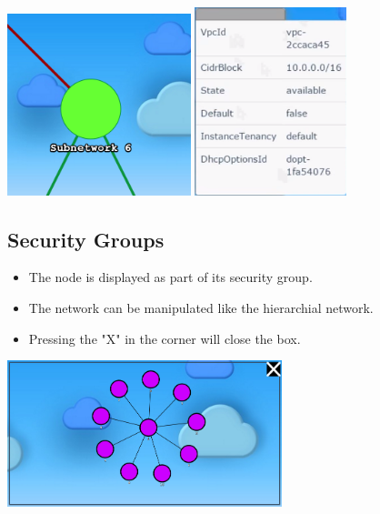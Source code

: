 \documentclass[hidelinks,a4paper,12pt]{article}
\begin{document}
				\begin{center}
					\includegraphics[width=0.40\textwidth]{./images/SelectNode.png}
					\includegraphics[width=0.33\textwidth]{./images/Info.png}
				\end{center}
			
		\subsection{Security Groups}
			\begin {itemize}
				\item The node is displayed as part of its security group.
				\item The network can be manipulated like the hierarchial network.
				\item Pressing the "X" in the corner will close the box.
			\end{itemize}
		
		\begin{center}
			\includegraphics[width=0.60\textwidth]{./images/SecurityGroup.png}
		\end{center}
		
\end{document}
